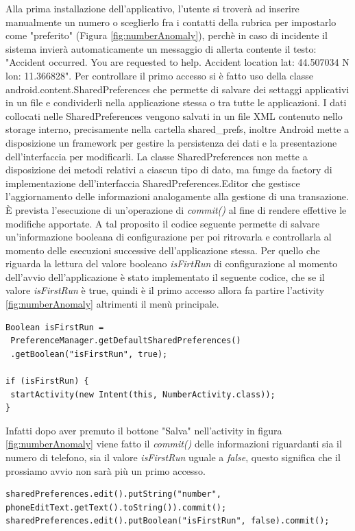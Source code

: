\documentclass[a4paper, 11pt]{article} %
\begin{document}
Alla prima installazione dell'applicativo, l'utente si troverà ad inserire manualmente un numero o sceglierlo fra i contatti della rubrica per impostarlo come "preferito" (Figura \ref{fig:numberAnomaly}), perchè in caso di incidente il sistema invierà automaticamente un messaggio di allerta contente il testo: "Accident occurred. You are requested to help. Accident location lat: 44.507034 N lon: 11.366828". Per controllare il primo accesso si è fatto uso della classe android.content.SharedPreferences che permette di salvare dei settaggi applicativi in un file e condividerli nella applicazione stessa o tra tutte le applicazioni. I dati collocati nelle SharedPreferences vengono salvati in un file XML contenuto nello storage interno, precisamente nella cartella shared\_prefs, inoltre Android mette a disposizione un framework per gestire la persistenza dei dati e la presentazione dell'interfaccia per modificarli.
La classe SharedPreferences non mette a disposizione dei metodi relativi a ciascun tipo di dato, ma funge da factory di implementazione dell'interfaccia SharedPreferences.Editor che gestisce l'aggiornamento delle informazioni analogamente alla gestione di una transazione. È prevista l'esecuzione di un'operazione di \textit{commit()} al fine di rendere effettive le modifiche apportate. A tal proposito il codice seguente permette di salvare un'informazione booleana di configurazione per poi ritrovarla e controllarla al momento delle esecuzioni successive dell'applicazione stessa. Per quello che riguarda la lettura del valore booleano \textit{isFirtRun} di configurazione al momento dell'avvio dell'applicazione è stato implementato il seguente codice, che se il valore \textit{isFirstRun} è true, quindi è il primo accesso allora fa partire l'activity \ref{fig:numberAnomaly} altrimenti il menù principale.
\begin{lstlisting}
Boolean isFirstRun =  
 PreferenceManager.getDefaultSharedPreferences()
 .getBoolean("isFirstRun", true);

if (isFirstRun) {
 startActivity(new Intent(this, NumberActivity.class));
}
\end{lstlisting}
Infatti dopo aver premuto il bottone "Salva" nell'activity in figura \ref{fig:numberAnomaly} viene fatto il \textit{commit()} delle informazioni riguardanti sia il numero di telefono, sia il valore \textit{isFirstRun} uguale a \textit{false}, questo significa che il prossiamo avvio non sarà più un primo accesso.
\begin{lstlisting}
sharedPreferences.edit().putString("number", phoneEditText.getText().toString()).commit();
sharedPreferences.edit().putBoolean("isFirstRun", false).commit();
\end{lstlisting}
\end{document}
